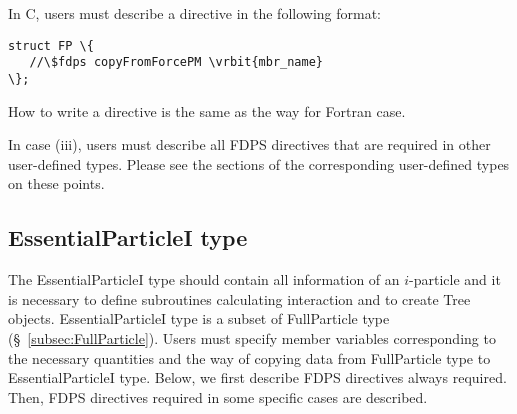 In C, users must describe a directive in the following format:
\begin{screen}
\begin{Verbatim}[commandchars=\\\{\}]
struct FP \{
   //\$fdps copyFromForcePM \vrbit{mbr_name}
\};
\end{Verbatim}
\end{screen}
How to write a directive is the same as the way for Fortran case.


In case (iii), users must describe all FDPS directives that are required in other user-defined types. Please see the sections of the corresponding user-defined types on these points.

\subsection{EssentialParticleI type}
\label{subsec:EssentialParticleI}
The EssentialParticleI type should contain all information of an $i$-particle and it is necessary to define subroutines calculating interaction and to create Tree objects. EssentialParticleI type is a subset of FullParticle type (\S~\ref{subsec:FullParticle}). Users must specify member variables corresponding to the necessary quantities and the way of copying data from FullParticle type to EssentialParticleI type. Below, we first describe FDPS directives always required. Then, FDPS directives required in some specific cases are described.


